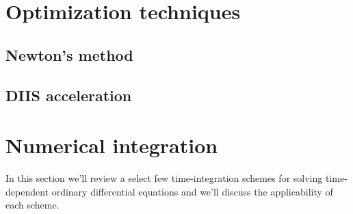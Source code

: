     \section{Optimization techniques}
        \subsection{Newton's method}
        \subsection{DIIS acceleration}
    \section{Numerical integration}
        In this section we'll review a select few time-integration schemes for
        solving time-dependent ordinary differential equations and we'll discuss the
        applicability of each scheme.

